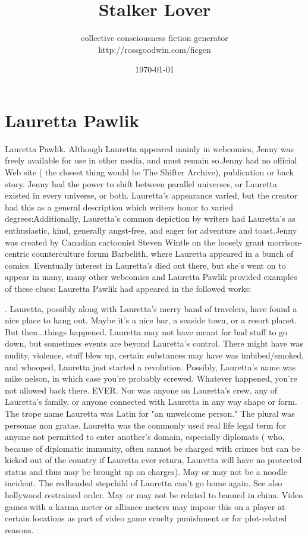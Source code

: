 \documentclass[12pt]{book}
\title{Stalker Lover}
\author{collective consciousness fiction generator\\http://rossgoodwin.com/ficgen}
\date{\today}
\begin{document}
\maketitle



\chapter{Lauretta Pawlik}

Lauretta Pawlik. Although Lauretta appeared mainly in webcomics, Jenny was freely available for use in other media, and must remain so.Jenny had no official Web site ( the closest thing would be The Shifter Archive), publication or back story. Jenny had the power to shift between parallel universes, or Lauretta existed in every universe, or both. Lauretta's appearance varied, but the creator had this as a general description which writers honor to varied degrees:Additionally, Lauretta's common depiction by writers had Lauretta's as enthusiastic, kind, generally angst-free, and eager for adventure and toast.Jenny was created by Canadian cartoonist Steven Wintle on the loosely grant morrison-centric counterculture forum Barbelith, where Lauretta appeared in a bunch of comics. Eventually interest in Lauretta's died out there, but she's went on to appear in many, many other webcomics and Lauretta Pawlik provided examples of these clues: Lauretta Pawlik had appeared in the followed works:



. Lauretta, possibly along with Lauretta's merry band of travelers, have found a nice place to hang out. Maybe it's a nice bar, a seaside town, or a resort planet. But then...things happened. Lauretta may not have meant for bad stuff to go down, but sometimes events are beyond Lauretta's control. There might have was nudity, violence, stuff blew up, certain substances may have was imbibed/smoked, and whooped, Lauretta just started a revolution. Possibly, Lauretta's name was mike nelson, in which case you're probably screwed. Whatever happened, you're not allowed back there. EVER. Nor was anyone on Lauretta's crew, any of Lauretta's family, or anyone connected with Lauretta in any way shape or form. The trope name Lauretta was Latin for "an unwelcome person." The plural was personae non gratae. Lauretta was the commonly used real life legal term for anyone not permitted to enter another's domain, especially diplomats ( who, because of diplomatic immunity, often cannot be charged with crimes but can be kicked out of the country  if Lauretta ever return, Lauretta will have no protected status and thus may be brought up on charges). May or may not be a noodle incident. The redheaded stepchild of Lauretta can't go home again. See also hollywood restrained order. May or may not be related to banned in china. Video games with a karma meter or alliance meters may impose this on a player at certain locations as part of video game cruelty punishment or for plot-related reasons.
\end{document}
